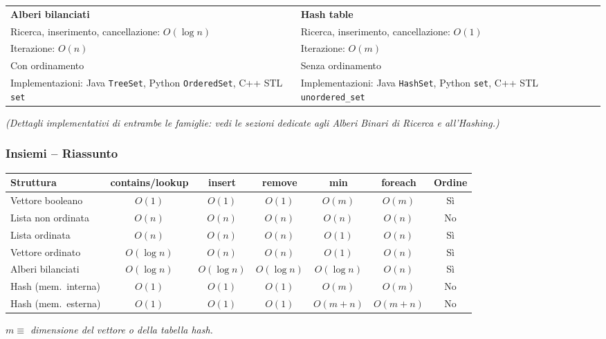 \documentclass[12pt, a4paper]{article}
\begin{document}
\begin{center}
\begin{tabular}{p{5.7cm}p{5.7cm}}
\textbf{Alberi bilanciati} & \textbf{Hash table} \\
Ricerca, inserimento, cancellazione: $O(\log n)$ & Ricerca, inserimento, cancellazione: $O(1)$ \\
Iterazione: $O(n)$ & Iterazione: $O(m)$ \\
Con ordinamento & Senza ordinamento \\
Implementazioni: Java \texttt{TreeSet}, Python \texttt{OrderedSet}, C++ STL \texttt{set} & Implementazioni: Java \texttt{HashSet}, Python \texttt{set}, C++ STL \texttt{unordered\_set} \\
\end{tabular}
\end{center}
\textit{(Dettagli implementativi di entrambe le famiglie: vedi le sezioni dedicate agli Alberi Binari di Ricerca e all'Hashing.)}

\subsubsection{Insiemi -- Riassunto}
\label{sec:insiemi-riassunto}

\begin{center}
\small
\begin{tabular}{lcccccc}
\toprule
\textbf{Struttura} & \textbf{contains/lookup} & \textbf{insert} & \textbf{remove} & \textbf{min} & \textbf{foreach} & \textbf{Ordine} \\
\midrule
Vettore booleano & $O(1)$ & $O(1)$ & $O(1)$ & $O(m)$ & $O(m)$ & Sì \\
Lista non ordinata & $O(n)$ & $O(n)$ & $O(n)$ & $O(n)$ & $O(n)$ & No \\
Lista ordinata & $O(n)$ & $O(n)$ & $O(n)$ & $O(1)$ & $O(n)$ & Sì \\
Vettore ordinato & $O(\log n)$ & $O(n)$ & $O(n)$ & $O(1)$ & $O(n)$ & Sì \\
Alberi bilanciati & $O(\log n)$ & $O(\log n)$ & $O(\log n)$ & $O(\log n)$ & $O(n)$ & Sì \\
Hash (mem.\ interna) & $O(1)$ & $O(1)$ & $O(1)$ & $O(m)$ & $O(m)$ & No \\
Hash (mem.\ esterna) & $O(1)$ & $O(1)$ & $O(1)$ & $O(m+n)$ & $O(m+n)$ & No \\
\bottomrule
\end{tabular}
\end{center}
\textit{$m \equiv$ dimensione del vettore o della tabella hash.}
\end{document}

